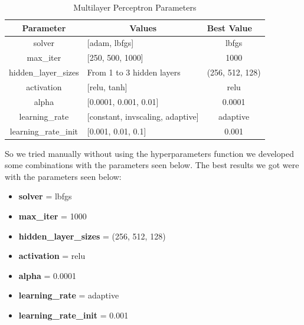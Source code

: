 \documentclass[conference]{IEEEtran}
\begin{document}
\begin{table}[!h]
    \centering
    
    \begin{tabular}{|c|l|c|}
    \hline
    \textbf{Parameter} & \multicolumn{1}{c|}{\textbf{Values}}     & \multicolumn{1}{l|}{\textbf{Best Value}} \\ \hline
    solver       & {[}adam, lbfgs{]}                  & lbfgs                                      \\ \hline
    max\_iter          & {[}250, 500, 1000{]}                      & 1000                                  \\ \hline
    hidden\_layer\_sizes         & From 1 to 3 hidden layers                  & (256, 512, 128)                                     \\ \hline
    activation  & {[}relu, tanh{]}                           & relu                                   \\ \hline
    alpha   & {[}0.0001, 0.001, 0.01{]}                            & 0.0001                               \\ \hline
    learning\_rate       & {[}constant, invscaling, adaptive{]}                   & adaptive                                    \\ \hline
    learning\_rate\_init    & {[}0.001, 0.01, 0.1{]}                   & 0.001                                    \\ \hline
    \end{tabular}
    \caption{Multilayer Perceptron Parameters \label{tab:mlp_parameters}}
\end{table}

So we tried manually without using the hyperparameters function we developed some combinations with the parameters seen below.
The best results we got were with the parameters seen below:
\begin{itemize}
    \item \textbf{solver} = lbfgs
    \item \textbf{max\_iter} = 1000
    \item \textbf{hidden\_layer\_sizes} = (256, 512, 128)
    \item \textbf{activation} = relu
    \item \textbf{alpha} = 0.0001
    \item \textbf{learning\_rate} = adaptive
    \item \textbf{learning\_rate\_init} = 0.001
\end{itemize}
\end{document}
